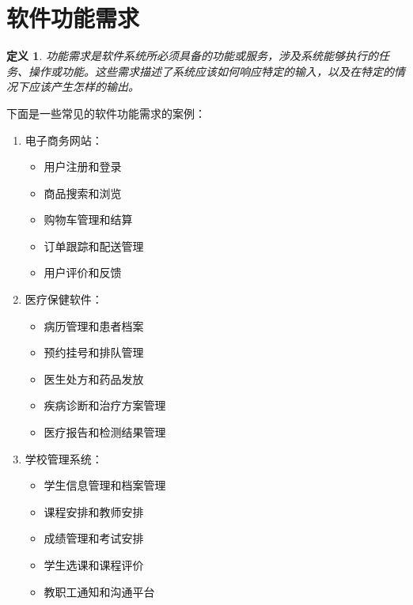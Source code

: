 \documentclass[11pt, a4paper, oneside]{ctexbook}
\newtheorem{definition}[theorem]{定义}
\begin{document}
\section{软件功能需求}
\begin{definition}
    功能需求是软件系统所必须具备的功能或服务，涉及系统能够执行的任务、操作或功能。这些需求描述了系统应该如何响应特定的输入，以及在特定的情况下应该产生怎样的输出。
\end{definition}
下面是一些常见的软件功能需求的案例：
\begin{enumerate}[itemsep=10pt,parsep=0pt,partopsep=0pt,topsep=0pt]
    \item 电子商务网站：
    
    \begin{itemize}[itemsep=0pt,parsep=0pt,partopsep=0pt,topsep=0pt]
        \item 用户注册和登录
        \item 商品搜索和浏览
        \item 购物车管理和结算
        \item 订单跟踪和配送管理
        \item 用户评价和反馈
    \end{itemize}
    \item 医疗保健软件：
    
    \begin{itemize}[itemsep=0pt,parsep=0pt,partopsep=0pt,topsep=0pt]
        \item 病历管理和患者档案
        \item 预约挂号和排队管理
        \item 医生处方和药品发放
        \item 疾病诊断和治疗方案管理
        \item 医疗报告和检测结果管理
    \end{itemize}
    \item 学校管理系统：
    
    \begin{itemize}[itemsep=0pt,parsep=0pt,partopsep=0pt,topsep=0pt]
        \item 学生信息管理和档案管理
        \item 课程安排和教师安排
        \item 成绩管理和考试安排
        \item 学生选课和课程评价
        \item 教职工通知和沟通平台
    \end{itemize}
\end{enumerate}
\end{document}
